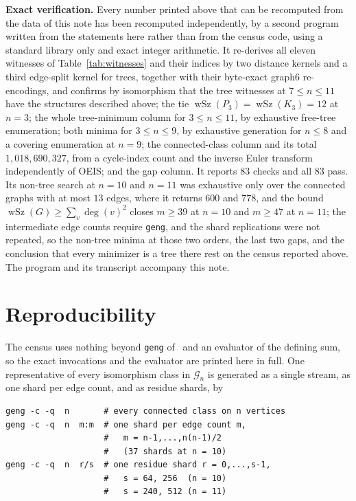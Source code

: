 \documentclass[11pt]{amsart}
\newcommand{\wSz}{\operatorname{wSz}}
\newcommand{\G}{\mathcal{G}}
\begin{document}
\noindent
\textbf{Exact verification.}
Every number printed above that can be recomputed from the data of
this note has been recomputed independently, by a second program
written from the statements here rather than from the census code,
using a standard library only and exact integer arithmetic. It
re-derives all eleven witnesses of
Table~\ref{tab:witnesses} and their indices by two distance kernels
and a third edge-split kernel for trees, together with their
byte-exact graph6 re-encodings, and confirms by isomorphism that the
tree witnesses at $7\le n\le 11$ have the structures described above;
the tie
$\wSz(P_3)=\wSz(K_3)=12$ at $n=3$; the whole tree-minimum column for
$3\le n\le 11$, by exhaustive free-tree enumeration; both minima for
$3\le n\le 9$, by exhaustive generation for $n\le 8$ and a covering
enumeration at $n=9$; the connected-class column and its total
$1{,}018{,}690{,}327$, from a cycle-index count and the inverse Euler
transform independently of OEIS; and the gap column. It reports $83$
checks and all $83$ pass. Its non-tree search at $n=10$ and $n=11$ was
exhaustive only over the connected graphs with at most $13$ edges,
where it returns $600$ and $778$, and the bound
$\wSz(G)\ge\sum_{v}\deg(v)^2$ closes $m\ge 39$ at $n=10$ and
$m\ge 47$ at $n=11$; the intermediate edge counts require
\texttt{geng}, and the shard replications were not repeated, so the
non-tree minima at those two orders, the last two gaps, and the
conclusion that every minimizer is a tree there rest on the census
reported above. The program and its transcript accompany this note.

\section*{Reproducibility}

The census uses nothing beyond \texttt{geng} of~\cite{McKayPiperno2014}
and an evaluator of the defining sum, so the exact invocations and the
evaluator are printed here in full. One representative of
every isomorphism class in $\G_n$ is generated as a single stream, as
one shard per edge count, and as residue shards, by

\begin{verbatim}
geng -c -q  n       # every connected class on n vertices
geng -c -q  n  m:m  # one shard per edge count m,
                    #   m = n-1,...,n(n-1)/2
                    #   (37 shards at n = 10)
geng -c -q  n  r/s  # one residue shard r = 0,...,s-1,
                    #   s = 64, 256  (n = 10)
                    #   s = 240, 512 (n = 11)
\end{verbatim}
\end{document}
